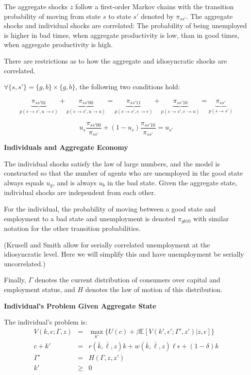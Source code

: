 \documentclass[titlepage]{\econtex}\providecommand{\texname}{KrusellSmithRep}%
\providecommand{\EqDir}{Equations}
\begin{document}


The aggregate shocks $z$ follow a first-order Markov chains with the transition probability of moving from state $s$ to state $s'$ denoted by $\pi_{ss'}$. The aggregate shocks and individual shocks are correlated: The probability of being unemployed is higher in bad times, when aggregate productivity is low, than in good times, when aggregate productivity is high.

There are restrictions as to how the aggregate and idiosyncratic shocks are correlated. 

$\forall \{s,s'\}=\{g,b\}\times\{g,b\}$, the following two conditions hold:

$$\underbrace{\pi_{ss'01}}_{p(s \rightarrow s',u \rightarrow e)}+\underbrace{\pi_{ss'00}}_{p(s \rightarrow s', u \rightarrow u)} = \underbrace{\pi_{ss'11}}_{p(s\rightarrow s', e \rightarrow e) }  + \underbrace{\pi_{ss'10}}_{p(s \rightarrow s', e \rightarrow u)} = \underbrace{\pi_{ss'}}_{p(s\rightarrow s')}$$

$$u_s \frac{\pi_{ss'00}}{\pi_{ss'}}+ (1-u_s) \frac{\pi_{ss'10}}{\pi_{ss'}} = u_{s'}$$

\textbf{Individuals and Aggregate Economy}

The individual shocks satisfy the law of large numbers, and the model is constructed so that the number of agents who are unemployed in the good state always equals $u_g$, and is always $u_b$ in the bad state. Given the aggregate state, individual shocks are independent from each other.

For the individual, the probability of moving between a good state and employment to a bad state and unemployment is denoted $\pi_{gb10}$ with similar notation for the other transition probabilities.

(Krusell and Smith allow for serially correlated unemployment at the idiosyncratic level. Here we will simplify this and have unemployment be serially uncorrelated.)

Finally, $\Gamma$ denotes the current distribution of consumers over capital and employment status, and $H$ denotes the law of motion of this distribution. 

\textbf{Individual's Problem Given Aggregate State}

The individual's problem is:
\begin{eqnarray*}
	V(k, \epsilon; \Gamma, z) &=& \max_{k'}\{U(c) + \beta \mathbb{E}[V(k' ,\epsilon'; \Gamma', z')|z, \epsilon]\} \\
	c + k' &=& r(\bar{k}, \bar{\ell}, z)k + w(\bar{k}, \bar{\ell}, z)\ell\epsilon + (1-\delta)k \\
	\Gamma' &=& H(\Gamma, z, z') \\
	k' &\geq& 0 \\
\end{eqnarray*}
\end{document}
